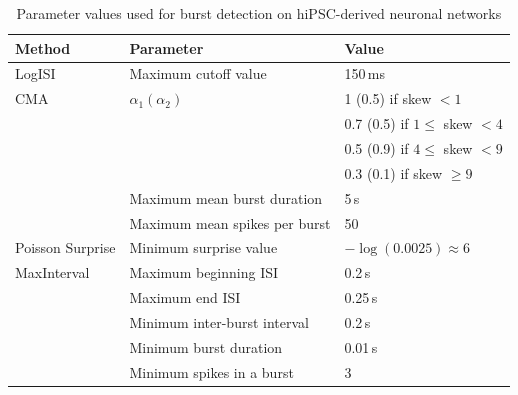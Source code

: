 \documentclass[12pt, titlepage]{article}
\begin{document}
		\begin{table}[h]
			\centering
			\begin{tabular}{|l|l|l|}
				\hline
				Method & Parameter & Value
				\\ \hline 
				\rowcolor{Gray} LogISI \cite{Pasquale2010} & Maximum cutoff value & 150$\,$ms
				\\ \hline
				CMA \cite{Kapucu2012} & $\alpha_1 (\alpha_2)$ & 1 (0.5) if skew $<1$
				\\ & &  0.7 (0.5) if $1 \leq $ skew $<4$
				\\ & & 0.5 (0.9) if $4 \leq $ skew $<9$
				\\ & & 0.3 (0.1) if  skew $\geq 9$
				\\ & Maximum mean burst duration & 5$\,$s
				\\ & Maximum mean spikes per burst & 50
				\\ \hline 
				\rowcolor{Gray} Poisson Surprise \cite{Legendy1985} & Minimum surprise value & $-\log(0.0025) \approx 6$
				\\ \hline 
				MaxInterval \cite{NEmanual} & Maximum beginning ISI & 0.2$\,$s
				\\ & Maximum end ISI & 0.25$\,$s
				\\ & Minimum inter-burst interval & 0.2$\,$s
				\\ & Minimum burst duration & 0.01$\,$s
				\\ & Minimum spikes in a burst & 3
				\\ \hline
			\end{tabular}
			\caption{Parameter values used for burst detection on hiPSC-derived neuronal networks}
			\label{param_vals_hum}
		\end{table}
\end{document}
